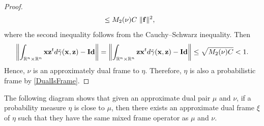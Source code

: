 \documentclass{amsart}
\numberwithin{equation}{section}
\newcommand{\norm}[1]{\left\Vert#1\right\Vert}
\theoremstyle{plain}
\theoremstyle{remark}
\theoremstyle{definition}
\begin{document}
\begin{proof}
\begin{equation*}
\begin{split}
      & \leq M_2(\nu)  C  \ \Vert  {\bf f} \Vert^2,
 \end{split}
    \end{equation*}
where the second inequality follows from the Cauchy–Schwarz inequality. Then
\begin{equation*}
    \norm{ \int_{\mathbb{R}^n \times \mathbb{R}^n} {\bf x} {\bf z}^t d\Tilde{\gamma}({\bf x, z}) - {\bf Id} } = \norm{\int_{\mathbb{R}^n \times \mathbb{R}^n} {\bf z} {\bf x}^t d\Tilde{\gamma}({\bf x, z}) - {\bf Id} }\leq \sqrt{M_2(\nu)  C } < 1 .
\end{equation*}
Hence, $\nu$ is an approximately dual frame to $\eta$. Therefore, $\eta$ is also a probabilistic frame by \cref{DualIsFrame}. 
\end{proof}

The following diagram shows that given an approximate dual pair $\mu$ and $\nu$, if a probability measure $\eta$ is close to $\mu$, then there exists an approximate dual frame $\xi$ of $\eta$ such that they have the same mixed frame operator as $\mu$ and $\nu$.  

 \begin{center}
\end{center}
\end{document}
